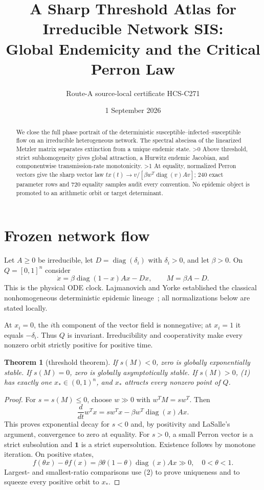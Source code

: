 \documentclass[10pt]{article}
\title{A Sharp Threshold Atlas for Irreducible Network SIS:\\Global Endemicity and the Critical Perron Law}
\author{Route-A source-local certificate HCS-C271}
\date{1 September 2026}
\providecommand{\CRevisionRound}{2}
\newtheorem{theorem}{Theorem}
\begin{document}
\maketitle
\begin{abstract}
We close the full phase portrait of the deterministic susceptible--infected--susceptible flow on an irreducible heterogeneous network.  The spectral abscissa of the linearized Metzler matrix separates extinction from a unique endemic state.
\ifnum\CRevisionRound>0 Above threshold, strict subhomogeneity gives global attraction, a Hurwitz endemic Jacobian, and componentwise transmission-rate monotonicity.\fi\space
\ifnum\CRevisionRound>1 At equality, normalized Perron vectors give the sharp vector law $t x(t)\to v/[\beta w^T\!\operatorname{diag}(v)Av]$; 240 exact parameter rows and 720 equality samples audit every convention.\fi\space
No epidemic object is promoted to an arithmetic orbit or target determinant.
\end{abstract}

\section{Frozen network flow}
Let $A\ge0$ be irreducible, let $D=\operatorname{diag}(\delta_i)$ with
$\delta_i>0$, and let $\beta>0$.  On $Q=[0,1]^n$ consider
\begin{equation}
 \dot x=\beta\operatorname{diag}(1-x)Ax-Dx,
 \qquad M=\beta A-D.                                      \tag{1}
\end{equation}
This is the physical ODE clock.  Lajmanovich and Yorke established the
classical nonhomogeneous deterministic epidemic lineage~\cite{LY}; all
normalizations below are stated locally.

At $x_i=0$, the $i$th component of the vector field is nonnegative; at
$x_i=1$ it equals $-\delta_i$.  Thus $Q$ is invariant.  Irreducibility and
cooperativity make every nonzero orbit strictly positive for positive time.

\begin{theorem}[threshold theorem]
If $s(M)<0$, zero is globally exponentially stable.  If $s(M)=0$, zero is
globally asymptotically stable.  If $s(M)>0$, (1) has exactly one
$x_*\in(0,1)^n$, and $x_*$ attracts every nonzero point of $Q$.
\end{theorem}
\begin{proof}
For $s=s(M)\le0$, choose $w\gg0$ with $w^TM=sw^T$.  Then
\[
 \frac d{dt}w^Tx=s w^Tx-\beta w^T\operatorname{diag}(x)Ax.
\]
This proves exponential decay for $s<0$ and, by positivity and LaSalle's
argument, convergence to zero at equality.  For $s>0$, a small Perron vector
is a strict subsolution and $\mathbf1$ is a strict supersolution.  Existence
follows by monotone iteration.  On positive states,
\[
 f(\theta x)-\theta f(x)=
 \beta\theta(1-\theta)\operatorname{diag}(x)Ax\gg0,
 \quad0<\theta<1.                                        \tag{2}
\]
Largest- and smallest-ratio comparisons use (2) to prove uniqueness and to
squeeze every positive orbit to $x_*$.
\end{proof}
\end{document}
